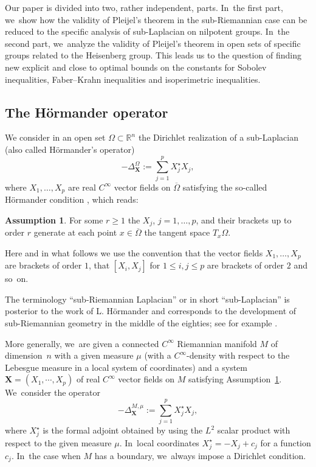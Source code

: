 \documentclass[11pt]{article}
\newcommand{\bX}{{\boldsymbol{X}}}
\theoremstyle{definition}
\newtheorem{assumption}[theorem]{Assumption}
\newcommand{\1}{\mathbbm{1}}
\numberwithin{equation}{section}
\begin{document}
Our paper is divided into two, rather independent, parts. In~the first part, we~show how the validity of Pleijel's theorem in the sub-Riemannian case can be reduced to the specific analysis of sub-Laplacian on nilpotent groups. In~the second part, we~analyze the validity of Pleijel's theorem in open sets of specific groups related to the Heisenberg group. This leads us to the question of finding new explicit and close to optimal bounds on the constants for Sobolev inequalities, Faber--Krahn inequalities and isoperimetric inequalities.

\subsection{The Hörmander operator}
We consider in an open set $\Omega \subset \mathbb R^n$ the Dirichlet realization of a sub-Laplacian (also called Hörmander's operator)
\[
-\Delta_\bX^\Omega :=\sum_{j=1}^p X_j^\star X_j,
\]
where $X_1,\ldots,X_p$ are real $C^\infty$ vector fields on $\overline\Omega$ satisfying the so-called Hörmander condition \cite{Ho}, which reads:

\begin{assumption}\label{CHOr}
For some $r\geq 1$ the $X_j$, $j=1,\ldots,p$, and their brackets up to order $r$ generate at each point $ x\in \overline{\Omega}$ the tangent space $T_x \Omega$.
\end{assumption}

Here and in what follows we use the convention that the vector fields $X_1,\ldots,X_p$ are brackets of order $1$, that $[X_i,X_j]$ for $1\leq i,j\leq p$ are brackets of order $2$ and so~on.

The terminology ``sub-Riemannian Laplacian'' or in short ``sub-Laplacian'' is posterior to the work of L. Hörmander and corresponds to the development of sub-Riemannian geometry in the middle of the eighties; see for example \cite{AgBaBo,BeRi,Je,Str2}.

More generally, we~are given a connected $C^\infty$ Riemannian manifold $M$ of dimension~$n$ with a given measure $\mu$ (with a $C^\infty$-density with respect to the Lebesgue measure in a local system of coordinates) and a system $\bX= (X_1,\cdots,X_p)$ of real $C^\infty$ vector fields on $M$ satisfying Assumption~\ref{CHOr}. We~consider the operator
\[
-\Delta_\bX^{M,\mu} :=\sum_{j=1}^p X_j^\star X_j,
\]
where $X_j^\star$ is the formal adjoint obtained by using the $L^2$ scalar product with respect to the given measure $\mu$. In~local coordinates $X_j^\star =- X_j +c_j$ for a function $c_j$. In~the case when $M$ has a boundary, we~always impose a Dirichlet condition.
\end{document}
